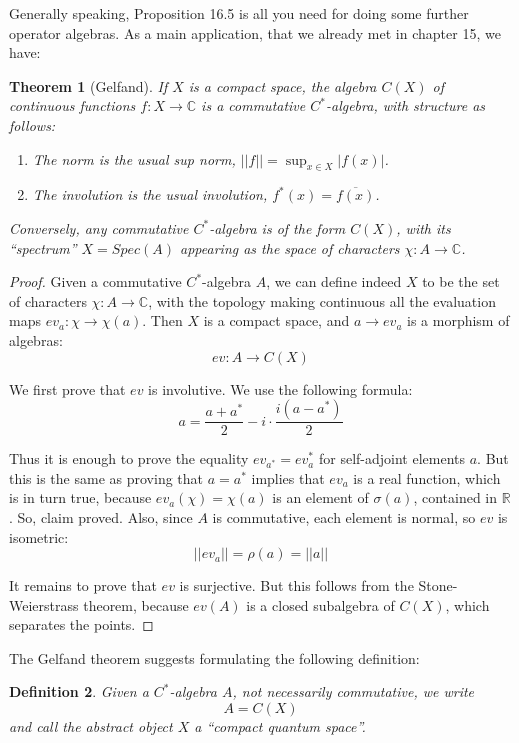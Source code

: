 \documentclass[12pt]{amsbook}
\newtheorem{theorem}{Theorem}[chapter]
\newtheorem{definition}[theorem]{Definition}
\begin{document}
Generally speaking, Proposition 16.5 is all you need for doing some further operator algebras. As a main application, that we already met in chapter 15, we have:

\begin{theorem}[Gelfand]
If $X$ is a compact space, the algebra $C(X)$ of continuous functions $f:X\to\mathbb C$ is a commutative $C^*$-algebra, with structure as follows:
\begin{enumerate}
\item The norm is the usual sup norm, $||f||=\sup_{x\in X}|f(x)|$.

\item The involution is the usual involution, $f^*(x)=\overline{f(x)}$.
\end{enumerate}
Conversely, any commutative $C^*$-algebra is of the form $C(X)$, with its ``spectrum'' $X=Spec(A)$ appearing as the space of characters $\chi :A\to\mathbb C$.
\end{theorem}

\begin{proof}
Given a commutative $C^*$-algebra $A$, we can define indeed $X$ to be the set of characters $\chi :A\to\mathbb C$, with the topology making continuous all the evaluation maps $ev_a:\chi\to\chi(a)$. Then $X$ is a compact space, and $a\to ev_a$ is a morphism of algebras:
$$ev:A\to C(X)$$

We first prove that $ev$ is involutive. We use the following formula:
$$a=\frac{a+a^*}{2}-i\cdot\frac{i(a-a^*)}{2}$$

Thus it is enough to prove the equality $ev_{a^*}=ev_a^*$ for self-adjoint elements $a$. But this is the same as proving that $a=a^*$ implies that $ev_a$ is a real function, which is in turn true, because $ev_a(\chi)=\chi(a)$ is an element of $\sigma(a)$, contained in $\mathbb R$. So, claim proved. Also, since $A$ is commutative, each element is normal, so $ev$ is isometric:
$$||ev_a||=\rho(a)=||a||$$

It remains to prove that $ev$ is surjective. But this follows from the Stone-Weierstrass theorem, because $ev(A)$ is a closed subalgebra of $C(X)$, which separates the points.
\end{proof}

The Gelfand theorem suggests formulating the following definition:

\begin{definition}
Given a $C^*$-algebra $A$, not necessarily commutative, we write
$$A=C(X)$$
and call the abstract object $X$ a ``compact quantum space''.
\end{definition}
\end{document}
